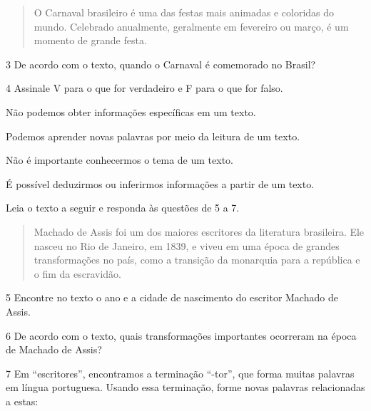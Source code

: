 \begin{quote}
O Carnaval brasileiro é uma das festas mais animadas e coloridas do
mundo. Celebrado anualmente, geralmente em fevereiro ou março, é um
momento de grande festa.

\end{quote}



\num{3} De acordo com o texto, quando o Carnaval é comemorado no Brasil?


\num{4} Assinale V para o que for verdadeiro e F para o que for falso.

\begin{boxlist}
 Não podemos obter informações específicas em um texto.

 Podemos aprender novas palavras por meio da leitura de um texto.

 Não é importante conhecermos o tema de um texto.

 É possível deduzirmos ou inferirmos informações a partir de um texto.
\end{boxlist}

Leia o texto a seguir e responda às questões de 5 a 7.

\begin{quote}
Machado de Assis foi um dos maiores escritores da literatura
brasileira. Ele nasceu no Rio de Janeiro, em 1839, e viveu em uma época
de grandes transformações no país, como a transição da monarquia para a
república e o fim da escravidão.

\end{quote}

\num{5} Encontre no texto o ano e a cidade de nascimento do escritor Machado de Assis.


\num{6} De acordo com o texto, quais transformações importantes ocorreram na época de Machado de Assis?


\num{7} Em “escritores”, encontramos a terminação “-tor”, que forma muitas palavras em língua portuguesa. Usando essa terminação, forme novas palavras relacionadas a estas:

